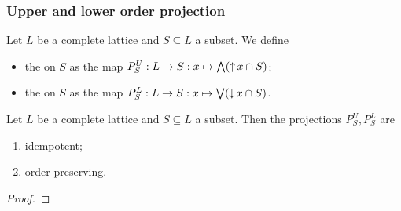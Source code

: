\subsubsection{Upper and lower order projection}
\begin{definition}
Let $L$ be a complete lattice and $S\subseteq L$ a subset. We define
\begin{itemize}
\item the  on $S$ as the map $P_S^U: L\to S: x\mapsto \bigwedge (\operatorname{\uparrow} x\cap S)$;
\item the  on $S$ as the map $P_S^L: L\to S: x\mapsto \bigvee (\operatorname{\downarrow} x\cap S)$.
\end{itemize}
\end{definition}

\begin{lemma}
Let $L$ be a complete lattice and $S\subseteq L$ a subset. Then the projections $P_S^U, P_S^L$ are
\begin{enumerate}
\item idempotent;
\item order-preserving.
\end{enumerate}
\end{lemma}
\begin{proof}

\end{proof}

